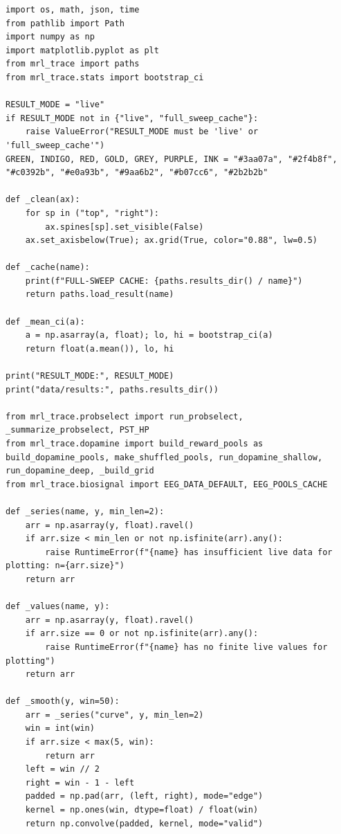 \begin{lstlisting}[caption={05\_biological\_grounding.ipynb code cell 1},label={lst:mrl-nb-05-biological-grounding-1}]
import os, math, json, time
from pathlib import Path
import numpy as np
import matplotlib.pyplot as plt
from mrl_trace import paths
from mrl_trace.stats import bootstrap_ci

RESULT_MODE = "live"
if RESULT_MODE not in {"live", "full_sweep_cache"}:
    raise ValueError("RESULT_MODE must be 'live' or 'full_sweep_cache'")
GREEN, INDIGO, RED, GOLD, GREY, PURPLE, INK = "#3aa07a", "#2f4b8f", "#c0392b", "#e0a93b", "#9aa6b2", "#b07cc6", "#2b2b2b"

def _clean(ax):
    for sp in ("top", "right"):
        ax.spines[sp].set_visible(False)
    ax.set_axisbelow(True); ax.grid(True, color="0.88", lw=0.5)

def _cache(name):
    print(f"FULL-SWEEP CACHE: {paths.results_dir() / name}")
    return paths.load_result(name)

def _mean_ci(a):
    a = np.asarray(a, float); lo, hi = bootstrap_ci(a)
    return float(a.mean()), lo, hi

print("RESULT_MODE:", RESULT_MODE)
print("data/results:", paths.results_dir())

from mrl_trace.probselect import run_probselect, _summarize_probselect, PST_HP
from mrl_trace.dopamine import build_reward_pools as build_dopamine_pools, make_shuffled_pools, run_dopamine_shallow, run_dopamine_deep, _build_grid
from mrl_trace.biosignal import EEG_DATA_DEFAULT, EEG_POOLS_CACHE

def _series(name, y, min_len=2):
    arr = np.asarray(y, float).ravel()
    if arr.size < min_len or not np.isfinite(arr).any():
        raise RuntimeError(f"{name} has insufficient live data for plotting: n={arr.size}")
    return arr

def _values(name, y):
    arr = np.asarray(y, float).ravel()
    if arr.size == 0 or not np.isfinite(arr).any():
        raise RuntimeError(f"{name} has no finite live values for plotting")
    return arr

def _smooth(y, win=50):
    arr = _series("curve", y, min_len=2)
    win = int(win)
    if arr.size < max(5, win):
        return arr
    left = win // 2
    right = win - 1 - left
    padded = np.pad(arr, (left, right), mode="edge")
    kernel = np.ones(win, dtype=float) / float(win)
    return np.convolve(padded, kernel, mode="valid")
\end{lstlisting}


